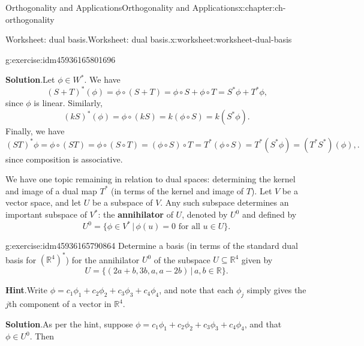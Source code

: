 \documentclass[oneside,10pt,]{book}
\newcommand{\blocktitlefont}{\relax}
\newcommand{\terminology}[1]{\textbf{#1}}
\numberwithin{equation}{section}
\newcommand{\R}{\mathbb{R}}
\begin{document}
\begin{chapterptx}{Orthogonality and Applications}{}{Orthogonality and Applications}{}{}{x:chapter:ch-orthogonality}
\begin{worksheet-section}{Worksheet: dual basis.}{}{Worksheet: dual basis.}{}{}{x:worksheet:worksheet-dual-basis}
\begin{divisionexercise}{4}{}{}{g:exercise:idm45936165801696}
\par\smallskip%
\noindent\textbf{\blocktitlefont Solution}.\label{g:solution:idm45936165797872}{}\hypertarget{g:solution:idm45936165797872}{}\quad{}Let \(\phi\in W^*\). We have%
\begin{equation*}
(S+T)^*(\phi) = \phi\circ(S+T) = \phi\circ S+\phi\circ T = S^*\phi+T^*\phi\text{,}
\end{equation*}
since \(\phi\) is linear. Similarly,%
\begin{equation*}
(kS)^*(\phi) = \phi\circ (kS) = k(\phi\circ S) = k(S^*\phi)\text{.}
\end{equation*}
Finally, we have%
\begin{equation*}
(ST)^*\phi = \phi\circ(ST) = \phi\circ(S\circ T) = (\phi\circ S)\circ T = T^*(\phi\circ S) = T^*(S^*\phi) = (T^*S^*)(\phi),\text{.}
\end{equation*}
since composition is associative.%
\end{divisionexercise}%
We have one topic remaining in relation to dual spaces: determining the kernel and image of a dual map \(T^*\) (in terms of the kernel and image of \(T\)). Let \(V\) be a vector space, and let \(U\) be a subspace of \(V\). Any such subspace determines an important subspace of \(V^*\): the \terminology{annihilator} of \(U\), denoted by \(U^0\) and defined by%
\begin{equation*}
U^0 = \{\phi\in V^* \,|\, \phi(u)=0 \text{ for all } u\in U\}\text{.}
\end{equation*}
%
\begin{divisionexercise}{5}{}{}{g:exercise:idm45936165790864}%
Determine a basis (in terms of the standard dual basis for \((\R^4)^*\)) for the annihilator \(U^0\) of the subspace \(U\subseteq \R^4\) given by%
\begin{equation*}
U = \{(2a+b,3b,a,a-2b)\,|\, a,b\in\R\}\text{.}
\end{equation*}
%
\par\smallskip%
\noindent\textbf{\blocktitlefont Hint}.\label{g:hint:idm45936165783792}{}\hypertarget{g:hint:idm45936165783792}{}\quad{}Write \(\phi = c_1\phi_1+c_2\phi_2+c_3\phi_3+c_4\phi_4\), and note that each \(\phi_j\) simply gives the \(j\)th component of a vector in \(\R^4\).%
\par\smallskip%
\noindent\textbf{\blocktitlefont Solution}.\label{g:solution:idm45936165781472}{}\hypertarget{g:solution:idm45936165781472}{}\quad{}As per the hint, suppose \(\phi = c_1\phi_1+c_2\phi_2+c_3\phi_3+c_4\phi_4\), and that \(\phi\in U^0\). Then%
\begin{align*}

\end{align*}
\end{divisionexercise}
\end{worksheet-section}
\end{chapterptx}
\end{document}
